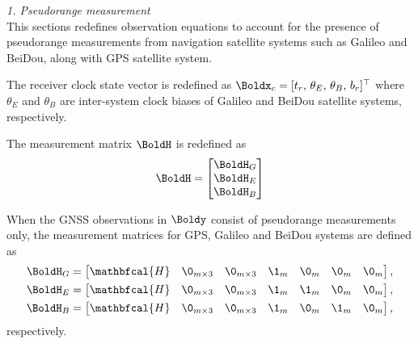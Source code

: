 \textit{1. Pseudorange measurement} \\
This sections redefines observation equations to account for the presence of
pseudorange measurements from navigation satellite systems such as Galileo and BeiDou, along with
GPS satellite system.

The receiver clock state vector is redefined as $\Boldx_c = [t_r, \, \theta_{E}, \, \theta_{B}, \, b_r]^\top$
where $\theta_E$ and $\theta_B$ are inter-system clock biases of Galileo and BeiDou satellite systems, respectively.

The measurement matrix $\BoldH$ is redefined as
\begin{equation}
	\BoldH = 
	\begin{bmatrix}
		\BoldH_G  \\ \BoldH_E  \\ \BoldH_B 
	\end{bmatrix}
\end{equation}

When the GNSS observations in $\Boldy$ consist of pseudorange measurements only, the measurement matrices for GPS, Galileo and BeiDou systems are defined as
\begin{align}
	\BoldH_G &= \begin{bmatrix}		
		\mathbfcal{H} & \0_{m \times 3} & \0_{m \times 3} & \1_m & \0_m & \0_m & \0_m		
	\end{bmatrix}, \nonumber \\
	\BoldH_E &= \begin{bmatrix}
		\mathbfcal{H} & \0_{m \times 3} & \0_{m \times 3} & \1_m & \1_m & \0_m  & \0_m	
	\end{bmatrix}, \nonumber \\
	\BoldH_B &= \begin{bmatrix}		
		\mathbfcal{H} & \0_{m \times 3} & \0_{m \times 3} & \1_m & \0_m & \1_m  & \0_m	
	\end{bmatrix},
\end{align}
respectively.


